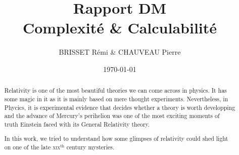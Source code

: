 \documentclass[12pt,a4paper]{article}
\title{Rapport DM \\
Complexité \& Calculabilité}
\author{BRISSET Rémi \& CHAUVEAU Pierre}
\date{\today}
\newcommand{\ofg}[1]{\og{}#1\fg{}}
\begin{document}
\maketitle

\begin{abstract}
    
    Relativity is one of the most beautiful theories we can come across in physics. It has some magic in it as it is mainly based on mere \ofg{thought experiments}. Nevertheless, in Phycics, it is experimental evidence that decides whether a theory is worth developping and the advance of Mercury's perihelion was one of the most exciting moments of truth Einstein faced with its \ofg{General Relativity} theory.
    
    In this work, we tried to understand how some glimpses of relativity could shed light on one of the late \textsc{xix}$^{\text{th}}$ century mysteries.
\end{abstract}
\end{document}
